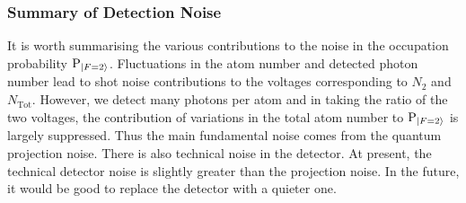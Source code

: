 
\subsubsection{Summary of Detection Noise}
It is worth summarising the various contributions to the noise in the
occupation probability $\text{P}_{\ket{F=2}}$. Fluctuations in the
atom number and detected photon number lead to shot noise
contributions to the voltages corresponding to $N_2$ and
$N_\text{Tot}$. However, we detect many photons per atom and in taking
the ratio of the two voltages, the contribution of variations in the
total atom number to $\text{P}_{\ket{F=2}}$ is largely suppressed.
Thus the main fundamental noise comes from the quantum projection
noise. There is also technical noise
in the detector. 
At present, the technical detector noise is slightly greater than the projection
noise. In the future, it would be good to replace the detector with a
quieter one.

